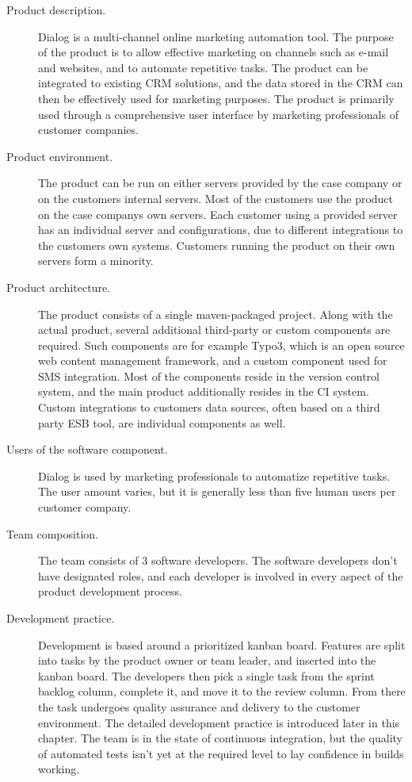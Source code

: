 \documentclass[english]{tktltiki2}
\theoremstyle{definition}
\theoremstyle{remark}
\begin{document}
\begin{description}
  \item[Product description.] Dialog is a multi-channel online marketing automation tool. The purpose of the product is to allow effective marketing on channels such as e-mail and websites, and to automate repetitive tasks. The product can be integrated to existing CRM solutions, and the data stored in the CRM can then be effectively used for marketing purposes. The product is primarily used through a comprehensive user interface by marketing professionals of customer companies. 
  \item[Product environment.] The product can be run on either servers provided by the case company or on the customers internal servers. Most of the customers use the product on the case companys own servers. Each customer using a provided server has an individual server and configurations, due to different integrations to the customers own systems. Customers running the product on their own servers form a minority.
  \item[Product architecture.] The product consists of a single maven-packaged project. Along with the actual product, several additional third-party or custom components are required. Such components are for example Typo3, which is an open source web content management framework, and a custom component used for SMS integration. Most of the components reside in the version control system, and the main product additionally resides in the CI system. Custom integrations to customers data sources, often based on a third party ESB tool, are individual components as well.
  \item[Users of the software component.] Dialog is used by marketing professionals to automatize repetitive tasks. The user amount varies, but it is generally less than five human users per customer company.
  \item[Team composition.] The team consists of 3 software developers. The software developers don't have designated roles, and each developer is involved in every aspect of the product development process.
  \item[Development practice.] Development is based around a prioritized kanban board. Features are split into tasks by the product owner or team leader, and inserted into the kanban board. The developers then pick a single task from the sprint backlog column, complete it, and move it to the review column. From there the task undergoes quality assurance and delivery to the customer environment. The detailed development practice is introduced later in this chapter. The team is in the state of continuous integration, but the quality of automated tests isn't yet at the required level to lay confidence in builds working. 

\end{description}
\end{document}
